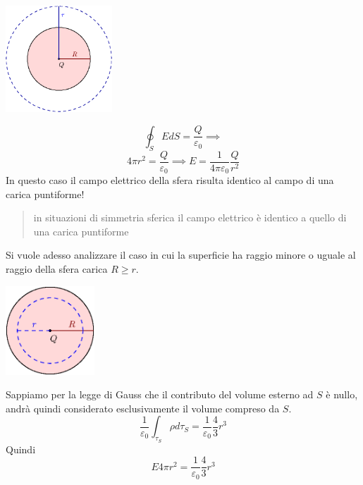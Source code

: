 \documentclass[10pt, letterpaper]{report}
\begin{document}
\begin{center}
    \includegraphics[width=0.3\textwidth]{images/sferaCarica.eps}
\end{center}
$$ \oint_S EdS=\frac{Q}{\varepsilon_0}\implies$$
$$ 4\pi r^2=\frac{Q}{\varepsilon_0}\implies 
E = \frac{1}{4\pi\varepsilon_0}\frac{Q}{ r^2}$$
In questo caso il campo elettrico della sfera risulta identico al campo di una carica puntiforme!
\begin{quote}
    in situazioni di simmetria sferica il campo elettrico è identico a quello di una carica puntiforme
\end{quote}
Si vuole adesso analizzare il caso in cui la superficie ha raggio minore o uguale al raggio della sfera carica $R\ge r$.
\begin{center}
    \includegraphics[width=0.25\textwidth]{images/sferaCarica2.eps}
\end{center}
Sappiamo per la legge di Gauss che il contributo del volume esterno ad $S$ è nullo, andrà quindi considerato esclusivamente il volume compreso da $S$. 
$$ \frac{1}{\varepsilon_0}\int_{\tau_S}\rho d\tau_S=\frac{1}{\varepsilon_0}\frac{4}{3}r^3$$
Quindi 
$$ E4\pi r^2=\frac{1}{\varepsilon_0}\frac{4}{3}r^3$$
\end{document}
